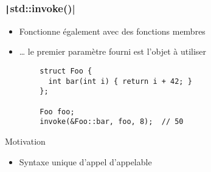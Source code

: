 \documentclass[C++.tex]{subfiles}
\begin{document}
\begin{frame}[fragile]
	\frametitle{\texttt|std::invoke()|}
	\begin{itemize}
		\item Fonctionne également avec des fonctions membres
		\item \ldots{} le premier paramètre fourni est l'objet à utiliser
	\end{itemize}

	\begin{verbatim}
		struct Foo {
		  int bar(int i) { return i + 42; }
		};

		Foo foo;
		invoke(&Foo::bar, foo, 8);  // 50
	\end{verbatim}

	\begin{block}{Motivation}
		\begin{itemize}
			\item Syntaxe unique d'appel d'appelable
		\end{itemize}
	\end{block}


\end{frame}
\end{document}
